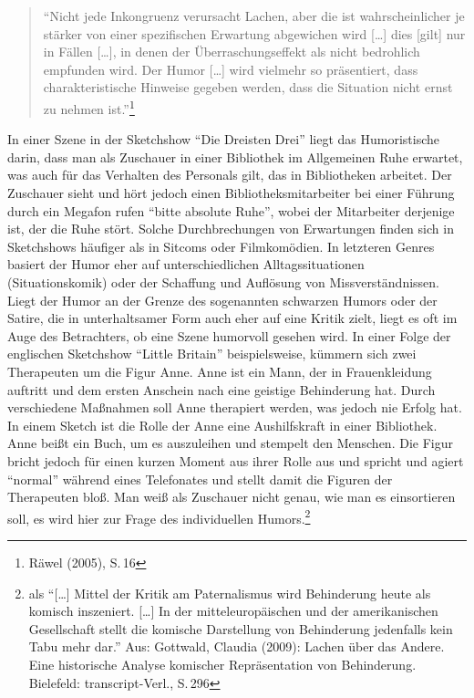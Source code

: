 \begin{flushleft}
\begin{quote}
\enquote{Nicht jede Inkongruenz verursacht Lachen, aber die ist
wahrscheinlicher je stärker von einer spezifischen Erwartung abgewichen
wird {[}\ldots{}{]} dies {[}gilt{]} nur in Fällen {[}\ldots{}{]}, in
denen der Überraschungseffekt als nicht bedrohlich empfunden wird. Der
Humor {[}\ldots{}{]} wird vielmehr so präsentiert, dass
charakteristische Hinweise gegeben werden, dass die Situation nicht
ernst zu nehmen ist.}\footnote{Räwel (2005), S.\,16}
\end{quote}
\end{flushleft}

In einer Szene in der Sketchshow \enquote{Die Dreisten Drei} liegt das
Humoristische darin, dass man als Zuschauer in einer Bibliothek im
Allgemeinen Ruhe erwartet, was auch für das Verhalten des Personals
gilt, das in Bibliotheken arbeitet. Der Zuschauer sieht und hört jedoch
einen Bibliotheksmitarbeiter bei einer Führung durch ein Megafon rufen
\enquote{bitte absolute Ruhe}, wobei der Mitarbeiter derjenige ist, der
die Ruhe stört. Solche Durchbrechungen von Erwartungen finden sich in
Sketchshows häufiger als in Sitcoms oder Filmkomödien. In letzteren
Genres basiert der Humor eher auf unterschiedlichen Alltagssituationen
(Situationskomik) oder der Schaffung und Auflösung von
Missverständnissen. Liegt der Humor an der Grenze des sogenannten
schwarzen Humors oder der Satire, die in unterhaltsamer Form
auch eher auf eine Kritik zielt, liegt es oft im Auge des Betrachters,
ob eine Szene humorvoll gesehen wird. In einer Folge der englischen
Sketchshow \enquote{Little Britain} beispielsweise, kümmern sich zwei
Therapeuten um die Figur Anne. Anne ist ein Mann, der in Frauenkleidung
auftritt und dem ersten Anschein nach eine geistige Behinderung hat.
Durch verschiedene Maßnahmen soll Anne therapiert werden, was jedoch nie
Erfolg hat. In einem Sketch ist die Rolle der Anne eine Aushilfskraft in
einer Bibliothek. Anne beißt ein Buch, um es auszuleihen und stempelt
den Menschen. Die Figur bricht jedoch für einen kurzen Moment aus ihrer
Rolle aus und spricht und agiert \enquote{normal} während eines
Telefonates und stellt damit die Figuren der Therapeuten bloß. Man weiß
als Zuschauer nicht genau, wie man es einsortieren soll, es wird hier
zur Frage des individuellen Humors.\footnote{als \enquote{{[}\ldots{}{]}
  Mittel der Kritik am Paternalismus wird Behinderung heute als komisch
  inszeniert. {[}\ldots{}{]} In der mitteleuropäischen und der
  amerikanischen Gesellschaft stellt die komische Darstellung von
  Behinderung jedenfalls kein Tabu mehr dar.} Aus: Gottwald, Claudia
  (2009): Lachen über das Andere. Eine historische Analyse komischer
  Repräsentation von Behinderung. Bielefeld: transcript-Verl., S.\,296}

